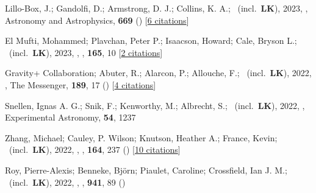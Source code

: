 \item[{\color{numcolor}\scriptsize79}] Lillo-Box, J.; Gandolfi, D.; Armstrong, D. J.; Collins, K. A.; \etal\ (incl.\ \textbf{LK}), 2023, , Astronomy and Astrophysics, \textbf{669} () [\href{https://ui.adsabs.harvard.edu/abs/2023A&A...669A.109L}{6 citations}]

\item[{\color{numcolor}\scriptsize78}] El Mufti, Mohammed; Plavchan, Peter P.; Isaacson, Howard; Cale, Bryson L.; \etal\ (incl.\ \textbf{LK}), 2023, , \aj, \textbf{165}, 10 [\href{https://ui.adsabs.harvard.edu/abs/2023AJ....165...10E}{2 citations}]

\item[{\color{numcolor}\scriptsize77}] Gravity+ Collaboration; Abuter, R.; Alarcon, P.; Allouche, F.; \etal\ (incl.\ \textbf{LK}), 2022, , The Messenger, \textbf{189}, 17 () [\href{https://ui.adsabs.harvard.edu/abs/2022Msngr.189...17A}{4 citations}]

\item[{\color{numcolor}\scriptsize76}] Snellen, Ignas A. G.; Snik, F.; Kenworthy, M.; Albrecht, S.; \etal\ (incl.\ \textbf{LK}), 2022, , Experimental Astronomy, \textbf{54}, 1237

\item[{\color{numcolor}\scriptsize75}] Zhang, Michael; Cauley, P. Wilson; Knutson, Heather A.; France, Kevin; \etal\ (incl.\ \textbf{LK}), 2022, , \aj, \textbf{164}, 237 () [\href{https://ui.adsabs.harvard.edu/abs/2022AJ....164..237Z}{10 citations}]

\item[{\color{numcolor}\scriptsize74}] Roy, Pierre-Alexis; Benneke, Bj{\"o}rn; Piaulet, Caroline; Crossfield, Ian J. M.; \etal\ (incl.\ \textbf{LK}), 2022, , \apj, \textbf{941}, 89 ()

